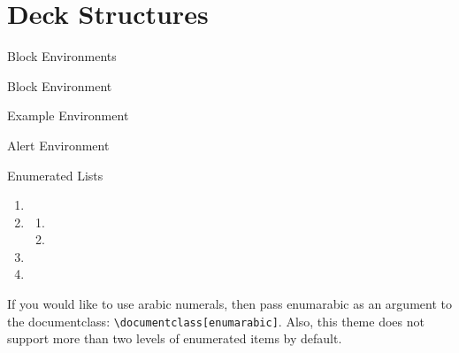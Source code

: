 \documentclass[aspectratio=169, sectionpages]{beamer}
\begin{document}
\section{Deck Structures}

\begin{frame}{Block Environments}
	\begin{block}{Block Environment}
		\lipsum[1][1]
	\end{block}
	\begin{exampleblock}{Example Environment}
		\lipsum[1][1]
	\end{exampleblock}
	\begin{alertblock}{Alert Environment}
		\lipsum[1][1]
	\end{alertblock}
\end{frame}

\begin{frame}[fragile]{Enumerated Lists}
	\begin{enumerate}
		\item \lipsum[1][1]
		\item \lipsum[1][2]
		      \begin{enumerate}
			      \item \lipsum[2][1]
			      \item \lipsum[2][2]
		      \end{enumerate}
		\item \lipsum[1][3]
		\item \lipsum[1][4]
	\end{enumerate}

	\remarks If you would like to use arabic numerals, then pass
	enumarabic as an argument to the documentclass: \verb+\documentclass[enumarabic]+.
	Also, this theme does not support more than two levels of enumerated items
	by default.

\end{frame}
\end{document}
